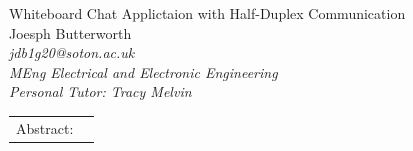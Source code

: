 \documentclass[10pt]{article}
\newcommand{\docTitle}{Whiteboard Chat Applictaion with Half-Duplex Communication}
\newcommand{\docAuthor}{Joesph Butterworth}
\begin{document}

{
    \centering
    \fontsize{28pt}{29.4pt} \selectfont
    \docTitle\\
    \vspace{25pt}
    \fontsize{11pt}{11.55pt}\selectfont
    \docAuthor\\
    \fontsize{10pt}{10.5pt}\selectfont
    \textit{jdb1g20@soton.ac.uk} \\ %
    \textit{MEng Electrical and Electronic Engineering} \\ 
    \textit{Personal Tutor: Tracy Melvin} \\ %
}
\vspace{25pt}

{
\setlength{\tabcolsep}{0cm} %
\centering
\begin{tabular}{p{2cm}p{\textwidth-2cm}}
    Abstract: &
    
\end{tabular}  
}
\vspace{25pt}
\end{document}
